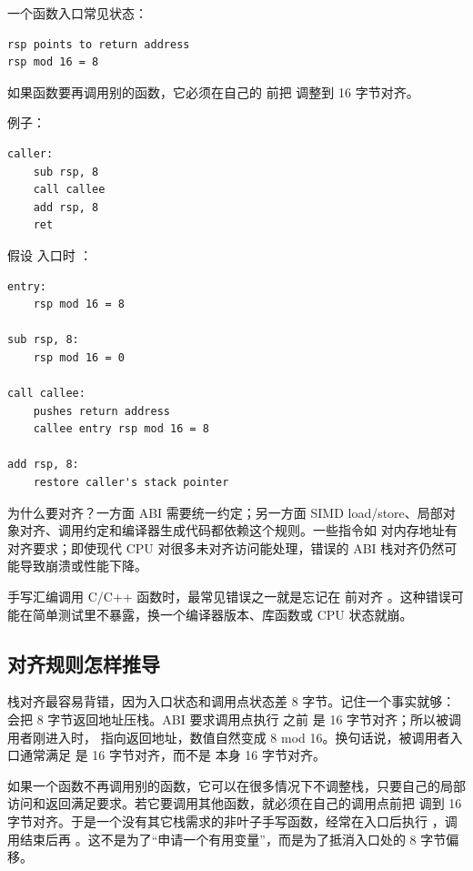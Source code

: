 一个函数入口常见状态：

\begin{lstlisting}
rsp points to return address
rsp mod 16 = 8
\end{lstlisting}

如果函数要再调用别的函数，它必须在自己的  前把  调整到 16 字节对齐。

例子：

\begin{lstlisting}
caller:
    sub rsp, 8
    call callee
    add rsp, 8
    ret
\end{lstlisting}

假设  入口时 ：

\begin{lstlisting}
entry:
    rsp mod 16 = 8

sub rsp, 8:
    rsp mod 16 = 0

call callee:
    pushes return address
    callee entry rsp mod 16 = 8

add rsp, 8:
    restore caller's stack pointer
\end{lstlisting}

为什么要对齐？一方面 ABI 需要统一约定；另一方面 SIMD load/store、局部对象对齐、调用约定和编译器生成代码都依赖这个规则。一些指令如  对内存地址有对齐要求；即使现代 CPU 对很多未对齐访问能处理，错误的 ABI 栈对齐仍然可能导致崩溃或性能下降。

\begin{warningbox}
手写汇编调用 C/C++ 函数时，最常见错误之一就是忘记在  前对齐 。这种错误可能在简单测试里不暴露，换一个编译器版本、库函数或 CPU 状态就崩。
\end{warningbox}

\subsection{对齐规则怎样推导}

栈对齐最容易背错，因为入口状态和调用点状态差 8 字节。记住一个事实就够： 会把 8 字节返回地址压栈。ABI 要求调用点执行  之前  是 16 字节对齐；所以被调用者刚进入时， 指向返回地址，数值自然变成 8 mod 16。换句话说，被调用者入口通常满足  是 16 字节对齐，而不是  本身 16 字节对齐。

如果一个函数不再调用别的函数，它可以在很多情况下不调整栈，只要自己的局部访问和返回满足要求。若它要调用其他函数，就必须在自己的调用点前把  调到 16 字节对齐。于是一个没有其它栈需求的非叶子手写函数，经常在入口后执行 ，调用结束后再 。这不是为了“申请一个有用变量”，而是为了抵消入口处的 8 字节偏移。

